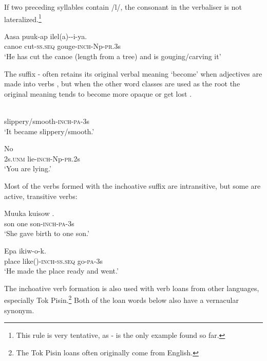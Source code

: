 If two preceding syllables contain /l/, the consonant in the verbaliser is not lateralized.\footnote{This rule is very tentative, as - is the only example found so far.}

\ea%
\label{ex:3:x200}
\gll Aasa puuk-ap ilel(a)--i-ya. \\
canoe cut-\textsc{ss}.\textsc{seq} gouge-\textsc{inch}-Np-\textsc{pr}.3s \\
\glt`He has cut the canoe (length from a tree) and is gouging/carving it' 
\z

The suffix - often retains its original verbal meaning `become' when adjectives are made into verbs , but when the other word classes are used as the root the original meaning tends to become more opaque or get lost . 

\ea%
\label{ex:3:x201}
\gll {} \\
slippery/smooth-\textsc{inch}-\textsc{pa}-3s \\
\glt`It became slippery/smooth.' 
\z

\ea%
\label{ex:3:x202}
\gll No  \\
2s.\textsc{unm} lie-\textsc{inch}-Np-\textsc{pr}.2s \\
\glt`You are lying.' 
\z

Most of the verbs formed with the inchoative suffix are intransitive, but some are active, transitive verbs:

\ea%
\label{ex:3:x203}
\gll Muuka kuisow . \\
son one son-\textsc{inch}-\textsc{pa}-3s \\
\glt`She gave birth to one son.'
\z

\ea%
\label{ex:3:x204}
\gll Epa  ikiw-o-k. \\
place like()-\textsc{inch}-\textsc{ss}.\textsc{seq} go-\textsc{pa}-3s \\
\glt`He made the place ready and went.'
\z

The inchoative verb formation is also used with verb loans from other languages, especially Tok Pisin.\footnote{The Tok Pisin loans often originally come from English.} Both of the loan words below also have a vernacular synonym.

